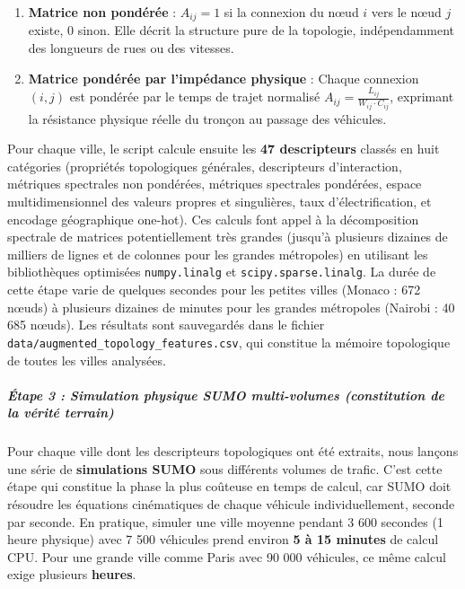 \documentclass[10pt, a4paper]{article}
\providecommand{\tightlist}{}
\begin{document}
\begin{enumerate}
\def\labelenumi{\arabic{enumi}.}
\tightlist
\item
  \textbf{Matrice non pondérée} : \(A_{ij} = 1\) si la connexion du nœud
  \(i\) vers le nœud \(j\) existe, \(0\) sinon. Elle décrit la structure
  pure de la topologie, indépendamment des longueurs de rues ou des
  vitesses.
\item
  \textbf{Matrice pondérée par l'impédance physique} : Chaque connexion
  \((i, j)\) est pondérée par le temps de trajet normalisé
  \(A_{ij} = \frac{L_{ij}}{W_{ij} \cdot C_{ij}}\), exprimant la
  résistance physique réelle du tronçon au passage des véhicules.
\end{enumerate}

Pour chaque ville, le script calcule ensuite les \textbf{47
descripteurs} classés en huit catégories (propriétés topologiques
générales, descripteurs d'interaction, métriques spectrales non
pondérées, métriques spectrales pondérées, espace multidimensionnel des
valeurs propres et singulières, taux d'électrification, et encodage
géographique one-hot). Ces calculs font appel à la décomposition
spectrale de matrices potentiellement très grandes (jusqu'à plusieurs
dizaines de milliers de lignes et de colonnes pour les grandes
métropoles) en utilisant les bibliothèques optimisées
\texttt{numpy.linalg} et \texttt{scipy.sparse.linalg}. La durée de cette
étape varie de quelques secondes pour les petites villes (Monaco : 672
nœuds) à plusieurs dizaines de minutes pour les grandes métropoles
(Nairobi : 40 685 nœuds). Les résultats sont sauvegardés dans le fichier
\texttt{data/augmented\_topology\_features.csv}, qui constitue la
mémoire topologique de toutes les villes analysées.

\subparagraph{Étape 3 : Simulation physique SUMO multi-volumes
(constitution de la vérité
terrain)}\label{uxe9tape-3-simulation-physique-sumo-multi-volumes-constitution-de-la-vuxe9rituxe9-terrain}

Pour chaque ville dont les descripteurs topologiques ont été extraits,
nous lançons une série de \textbf{simulations SUMO} sous différents
volumes de trafic. C'est cette étape qui constitue la phase la plus
coûteuse en temps de calcul, car SUMO doit résoudre les équations
cinématiques de chaque véhicule individuellement, seconde par seconde.
En pratique, simuler une ville moyenne pendant 3 600 secondes (1 heure
physique) avec 7 500 véhicules prend environ \textbf{5 à 15 minutes} de
calcul CPU. Pour une grande ville comme Paris avec 90 000 véhicules, ce
même calcul exige plusieurs \textbf{heures}.
\end{document}
